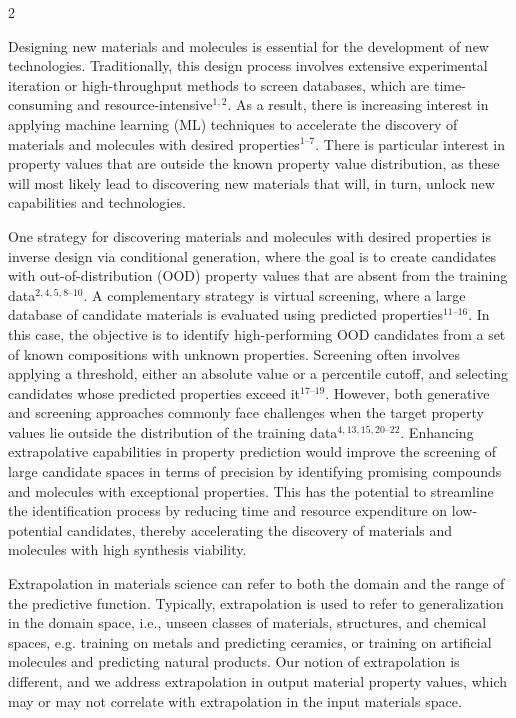 \documentclass[10pt]{article}
\begin{document}
\vspace{18pt}
\begin{multicols}{2}
{\fontsize{10.2}{13.8}\selectfont
Designing new materials and molecules is essential for the development of new technologies. Traditionally, this design process involves extensive experimental iteration or high-throughput methods to screen databases, which are time-consuming and resource-intensive$^{1,2}$. As a result, there is increasing interest in applying machine learning (ML) techniques to accelerate the discovery of materials and molecules with desired properties$^{1–7}$. There is particular interest in property values that are outside the known property value distribution, as these will most likely lead to discovering new materials that will, in turn, unlock new capabilities and technologies.

One strategy for discovering materials and molecules with desired properties is inverse design via conditional generation, where the goal is to create candidates with out-of-distribution (OOD) property values that are absent from the training data$^{2,4,5,8–10}$. A complementary strategy is virtual screening, where a large database of candidate materials is evaluated using predicted properties$^{11–16}$. In this case, the objective is to identify high-performing OOD candidates from a set of known compositions with unknown properties. Screening often involves applying a threshold, either an absolute value or a percentile cutoff, and selecting candidates whose predicted properties exceed it$^{17–19}$. However, both generative and screening approaches commonly face challenges when the target property values lie outside the distribution of the training data$^{4,13,15,20–22}$. Enhancing extrapolative capabilities in property prediction would improve the screening of large candidate spaces in terms of precision by identifying promising compounds and molecules with exceptional properties. This has the potential to streamline the identification process by reducing time and resource expenditure on low-potential candidates, thereby accelerating the discovery of materials and molecules with high synthesis viability.

Extrapolation in materials science can refer to both the domain and the range of the predictive function. Typically, extrapolation is used to refer to generalization in the domain space, i.e., unseen classes of materials, structures, and chemical spaces, e.g. training on metals and predicting ceramics, or training on artificial molecules and predicting natural products. Our notion of extrapolation is different, and we address extrapolation in output material property values, which may or may not correlate with extrapolation in the input materials space.

}
\end{multicols}
\end{document}
